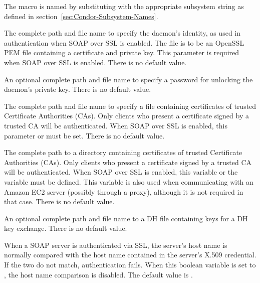 \begin{description}
  The macro is named by substituting 
  with the appropriate subsystem string as defined in
  section~\ref{sec:Condor-Subsystem-Names}.

\label{param:SoapSSLServerKeyfile}
\item[\Macro{SOAP\_SSL\_SERVER\_KEYFILE}]
  The complete path and file name to specify the daemon's
  identity, as used in authentication when SOAP over SSL is enabled.
  The file is to be  an OpenSSL PEM file containing a certificate
  and private key.
  This parameter is required when SOAP over SSL is enabled.
  There is no default value.

\label{param:SoapSSLServerKeyfilePassword}
\item[\Macro{SOAP\_SSL\_SERVER\_KEYFILE\_PASSWORD}]
  An optional complete path and file name to specify
  a password for unlocking the daemon's private key.
  There is no default value.

\label{param:SoapSSLCaFile}
\item[\Macro{SOAP\_SSL\_CA\_FILE}]
  The complete path and file name to specify 
  a file containing certificates of trusted Certificate Authorities (CAs).
  Only clients who present a certificate signed by a trusted
  CA will be authenticated.
  When SOAP over SSL is enabled, this parameter or
   must be set.
  There is no default value.

\label{param:SoapSSLCaDir}
\item[\Macro{SOAP\_SSL\_CA\_DIR}]
  The complete path to a directory
  containing certificates of trusted Certificate Authorities (CAs).
  Only clients who present a certificate signed by a trusted
  CA will be authenticated.
  When SOAP over SSL is enabled, this variable or the variable
   must be defined.
  This variable is also used when communicating with an Amazon EC2 server
  (possibly through a proxy), although it is not required in that case.
  There is no default value.

\label{param:SoapSSLDhFile}
\item[\Macro{SOAP\_SSL\_DH\_FILE}]
  An optional complete path and file name to a DH file
  containing keys for a DH key exchange.
  There is no default value.

\label{param:SoapSslSkipHostCheck}
\item[\Macro{SOAP\_SSL\_SKIP\_HOST\_CHECK}]
  When a SOAP server is authenticated via SSL, the server's host name
  is normally compared with the host name contained in the server's
  X.509 credential. If the two do not match, authentication fails.
  When this boolean variable is set to ,
  the host name comparison is disabled.
  The default value is .

\end{description}



